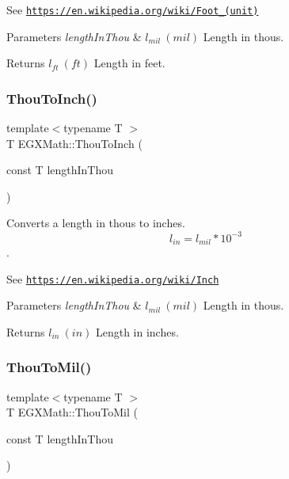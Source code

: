 See \href{https://en.wikipedia.org/wiki/Foot_(unit)}{\tt https\+://en.\+wikipedia.\+org/wiki/\+Foot\+\_\+(unit)} 
\begin{DoxyParams}{Parameters}
{\em length\+In\+Thou} & $ l_{mil}\ (mil)$ Length in thous. \\
\hline
\end{DoxyParams}
\begin{DoxyReturn}{Returns}
$ l_{ft}\ (ft)$ Length in feet. 
\end{DoxyReturn}
\mbox{\label{group___e_g_x_math-_conversions-_length_conversions-_imperial-_thou-_imperial_gad8bbba80b7d752a5edd4453fef6c0772}} 
\subsubsection{\texorpdfstring{Thou\+To\+Inch()}{ThouToInch()}}
{\footnotesize\ttfamily template$<$typename T $>$ \\
T E\+G\+X\+Math\+::\+Thou\+To\+Inch (\begin{DoxyParamCaption}\item[{const T}]{length\+In\+Thou }\end{DoxyParamCaption})}



Converts a length in thous to inches. \[ l_{in}= l_{mil} * 10^{-3} \]. 

See \href{https://en.wikipedia.org/wiki/Inch}{\tt https\+://en.\+wikipedia.\+org/wiki/\+Inch} 
\begin{DoxyParams}{Parameters}
{\em length\+In\+Thou} & $ l_{mil}\ (mil)$ Length in thous. \\
\hline
\end{DoxyParams}
\begin{DoxyReturn}{Returns}
$ l_{in}\ (in)$ Length in inches. 
\end{DoxyReturn}
\mbox{\label{group___e_g_x_math-_conversions-_length_conversions-_imperial-_thou-_imperial_ga3e51ce22cf63efe45874ca707dbc1506}} 
\subsubsection{\texorpdfstring{Thou\+To\+Mil()}{ThouToMil()}}
{\footnotesize\ttfamily template$<$typename T $>$ \\
T E\+G\+X\+Math\+::\+Thou\+To\+Mil (\begin{DoxyParamCaption}\item[{const T}]{length\+In\+Thou }\end{DoxyParamCaption})}



